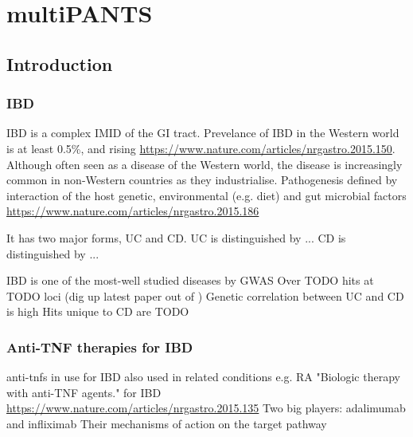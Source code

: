 %
%

\chapter{multiPANTS}

\begin{outline}

\section{Introduction}

\subsection{IBD}

\1 IBD is a complex IMID of the GI tract.
    \2 Prevelance of IBD in the Western world is at least 0.5\%, and rising \url{https://www.nature.com/articles/nrgastro.2015.150}.
    \2 Although often seen as a disease of the Western world, the disease is increasingly common in non-Western countries as they industrialise.
    \2 Pathogenesis defined by interaction of the host genetic, environmental (e.g. diet) and gut microbial factors \url{https://www.nature.com/articles/nrgastro.2015.186}

\1 It has two major forms, UC and CD.
    \1 UC is distinguished by ...
    \2 CD is distinguished by ... \autocite{roda2020CrohnDisease}

\1 IBD is one of the most-well studied diseases by GWAS
    \2 Over TODO hits at TODO loci (dig up latest paper out of \autocite{delange2017GenomewideAssociationStudy,huang2017FinemappingInflammatoryBowel,luo2017ExploringGeneticArchitecture})
    \2 Genetic correlation between UC and CD is high
    \2 Hits unique to CD are TODO

\subsection{Anti-TNF therapies for IBD}

\1 anti-tnfs in use for IBD
    \2 also used in related conditions e.g. RA \autocite{mulhearn2019UsingImmunophenotypePredict}
    \2 "Biologic therapy with anti-TNF agents." for IBD \url{https://www.nature.com/articles/nrgastro.2015.135}
        \3 Two big players: adalimumab and infliximab \autocite{adegbola2018AntiTNFTherapyCrohn}
        \3 Their mechanisms of action on the target pathway \autocite{levin2016MechanismActionAntiTNF}


\end{outline}
